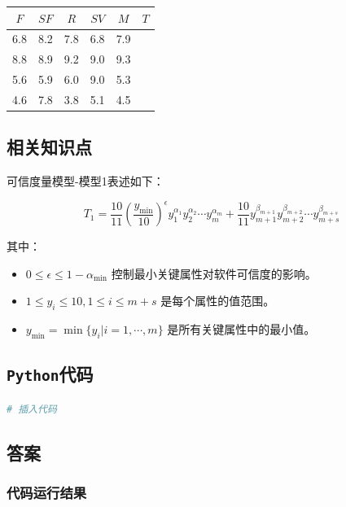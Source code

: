 \documentclass{article}
\begin{document}
\begin{center}
	\begin{tabular}{|c|c|c|c|c|c|}
		\hline
		$ F $ & $ SF $ & $ R $ & $ SV $ & $ M $ & $ T $ \\ \hline
		6.8     & 8.2      & 7.8     & 6.8      & 7.9     &         \\ \hline
		8.8     & 8.9      & 9.2     & 9.0      & 9.3     &         \\ \hline
		5.6     & 5.9      & 6.0     & 9.0      & 5.3     &         \\ \hline
		4.6     & 7.8      & 3.8     & 5.1      & 4.5     &         \\ \hline
	\end{tabular}
\end{center}

\subsection{相关知识点}

可信度量模型-模型1表述如下：

$$
T_1 = \frac{10}{11}\left(\frac{y_{\text{min}}}{10}\right)^\epsilon y^{\alpha_1}_1 y^{\alpha_2}_2 \cdots y^{\alpha_m}_m + \frac{10}{11} y^{\beta_{m+1}}_{m+1} y^{\beta_{m+2}}_{m+2} \cdots y^{\beta_{m+s}}_{m+s}
$$

其中：
\begin{itemize}
	\item $0 \leq \epsilon \leq 1 - \alpha_{\text{min}}$ 控制最小关键属性对软件可信度的影响。
	\item $1 \leq y_i \leq 10, 1 \leq i \leq m+s$ 是每个属性的值范围。
	\item $y_{\text{min}} = \min\{y_i | i=1, \cdots, m\}$ 是所有关键属性中的最小值。
\end{itemize}

\subsection{\texttt{Python}代码}

\begin{lstlisting}[language=Python]
	# 插入代码
\end{lstlisting}

\subsection{答案}

\subsubsection{代码运行结果}
\end{document}
